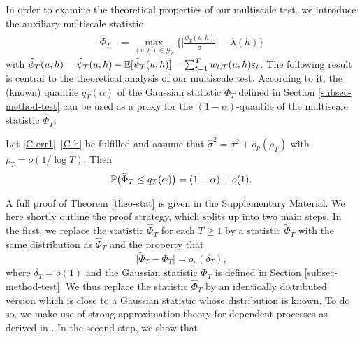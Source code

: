 In order to examine the theoretical properties of our multiscale test, we introduce the auxiliary multiscale statistic 
\begin{align}
\widehat{\Phi}_T 
 & = \max_{(u,h) \in \mathcal{G}_T} \Big\{ \Big| \frac{\widehat{\phi}_T(u,h)}{\widehat{\sigma}} \Big| - \lambda(h) \Big\} \label{Phi-hat-statistic}
\end{align}
with $\widehat{\phi}_T(u,h) = \widehat{\psi}_T(u,h) - \mathbb{E} [\widehat{\psi}_T(u,h)] = \sum\nolimits_{t=1}^T w_{t,T}(u,h) \varepsilon_t$. The following result is central to the theoretical analysis of our multiscale test. According to it, the (known) quantile $q_T(\alpha)$ of the Gaussian statistic $\Phi_T$ defined in Section \ref{subsec-method-test} can be used as a proxy for the $(1-\alpha)$-quantile of the multiscale statistic $\widehat{\Phi}_T$.
\begin{theorem}\label{theo-stat}
Let \ref{C-err1}--\ref{C-h} be fulfilled and assume that $\widehat{\sigma}^2 = \sigma^2 + o_p(\rho_T)$ with $\rho_T = o(1/\log T)$. Then 
\[ \mathbb{P} \big( \widehat{\Phi}_T \le q_T(\alpha) \big) = (1 - \alpha) + o(1). \]
\end{theorem}
A full proof of Theorem \ref{theo-stat} is given in the Supplementary Material. 
We here shortly outline the proof strategy, which splits up into two main steps. 
In the first, we replace the statistic $\widehat{\Phi}_T$ for each $T \ge 1$ by a statistic $\widetilde{\Phi}_T$ with the same distribution as $\widehat{\Phi}_T$ and the property that 
\begin{equation}\label{eq-theo-stat-strategy-step1}
\big| \widetilde{\Phi}_T - \Phi_T \big| = o_p(\delta_T),
\end{equation}
where $\delta_T = o(1)$ and the Gaussian statistic $\Phi_T$ is defined in Section \ref{subsec-method-test}. We thus replace the statistic $\widehat{\Phi}_T$ by an identically distributed version which is close to a Gaussian statistic whose distribution is known. To do so, we make use of strong approximation theory for dependent processes as derived in \cite{BerkesLiuWu2014}. In the second step, we show that 

